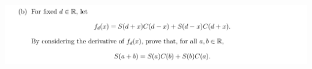 \documentclass[12pt]{article}
\begin{document}
\newpage
\subsection{}
\begin{mdframed}
\includegraphics[width=400pt]{img/analysis--oxford-M2-I-7-8-b.png}
\end{mdframed}
\end{document}
